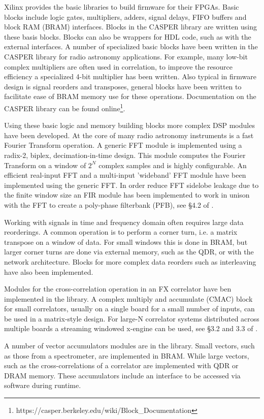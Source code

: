 \documentclass{ws-jai}
\begin{document}
Xilinx provides the basic libraries to build firmware for their FPGAs. Basic
blocks include logic gates, multipliers, adders, signal delays, FIFO buffers and
block RAM (BRAM) interfaces. Blocks in the CASPER library are written using
these basis blocks. Blocks can also be wrappers for HDL code, such as with the
external interfaces. A number of specialized basic blocks have been written in
the CASPER library for radio astronomy applications. For example, many low-bit
complex multipliers are often used in correlation, to improve the resource
efficiency a specialized 4-bit multiplier has been written. Also typical in
firmware design is signal reorders and transposes, general blocks have been
written to facilitate ease of BRAM memory use for these operations.
Documentation on the CASPER library can be found
online\footnote{https://casper.berkeley.edu/wiki/Block\_Documentation}.

Using these basic logic and memory building blocks more complex DSP modules have
been developed. At the core of many radio astronomy instruments is a fast Fourier
Transform operation. A generic FFT module is implemented using a radix-2,
biplex, decimation-in-time design. This module computes the Fourier Transform on
a window of $2^N$ complex samples and is highly configurable. An efficient
real-input FFT and a multi-input 'wideband' FFT module have been implemented
using the generic FFT. In order reduce FFT sidelobe leakage due to the finite
window size an FIR module has been implemented to work in unison with the FFT to
create a poly-phase filterbank (PFB), see \S 4.2 of \citet{price13}.

Working with signals in time and frequency domain often requires large data
reorderings. A common operation is to perform a corner turn, i.e. a matrix
transpose on a window of data. For small windows this is done in BRAM, but
larger corner turns are done via external memory, such as the QDR, or with the
network architecture. Blocks for more complex data reorders such as interleaving
have also been implemented.

Modules for the cross-correlation operation in an FX correlator have ben
implemented in the library. A complex multiply and accumulate (CMAC) block for
small correlators, usually on a single board for a small number of inputs, can
be used in a matrix-style design. For large-N correlator systems distributed
across multiple boards a streaming windowed x-engine can be used, see \S 3.2 and
3.3 of \citet{hickish14}.

A number of vector accumulators modules are in the library.
Small vectors, such as those from a spectrometer, are implemented in BRAM. While
large vectors, such as the cross-correlations of a correlator are implemented
with QDR or DRAM memory. These accumulators include an interface to be accessed
via software during runtime.
\end{document}
